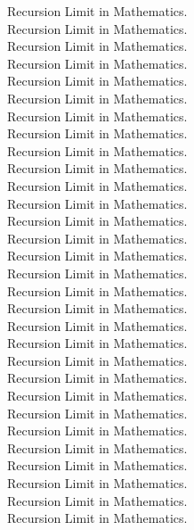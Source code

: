 \documentclass{homework}
\begin{document}
{Recursion Limit in Mathematics.\\
Recursion Limit in Mathematics.\\
Recursion Limit in Mathematics.\\
Recursion Limit in Mathematics.\\
Recursion Limit in Mathematics.\\
Recursion Limit in Mathematics.\\
Recursion Limit in Mathematics.\\
Recursion Limit in Mathematics.\\
Recursion Limit in Mathematics.\\
Recursion Limit in Mathematics.\\
Recursion Limit in Mathematics.\\
Recursion Limit in Mathematics.\\
Recursion Limit in Mathematics.\\
Recursion Limit in Mathematics.\\
Recursion Limit in Mathematics.\\
Recursion Limit in Mathematics.\\
Recursion Limit in Mathematics.\\
Recursion Limit in Mathematics.\\
Recursion Limit in Mathematics.\\
Recursion Limit in Mathematics.\\
Recursion Limit in Mathematics.\\
Recursion Limit in Mathematics.\\
Recursion Limit in Mathematics.\\
Recursion Limit in Mathematics.\\
Recursion Limit in Mathematics.\\
Recursion Limit in Mathematics.\\
Recursion Limit in Mathematics.\\
Recursion Limit in Mathematics.\\
Recursion Limit in Mathematics.\\
Recursion Limit in Mathematics.\\
}%
	
	\pagebreak
	
	\restoregeometry

	\quest %
	
\end{document}
